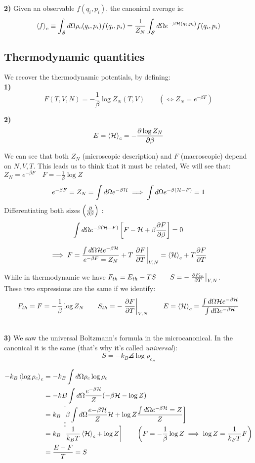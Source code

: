 \textbf{2)} Given an observable $f(q_i,p_i)$, the canonical average is:
$$ \left<f\right>_c \equiv \int_{\mathcal{S}} d\Omega \rho_c(q_i,p_i) f(q_i,p_i) = \frac 1{Z_N} \int_{\mathcal{S}} d\Omega e^{-\beta \mathcal{H}(q_i,p_i)} f(q_i,p_i)$$

\subsection{Thermodynamic quantities}
We recover the thermodynamic potentials, by defining:\\

\textbf{1)} $$F(T,V,N) = -\frac 1\beta \log Z_N(T,V) \qquad (\iff Z_N = e^{-\beta F})$$

\textbf{2)} $$E = \left<\mathcal{H}\right>_c = -\frac{\partial\log Z_N}{\partial\beta}$$

\Pf We can see that both $Z_N$ (microscopic description) and $F$ (macroscopic) depend on $N,V,T$. This leads us to think that it must be related,  We will see that: $Z_N = e^{-\beta F} \quad F = -\frac 1{\beta} \log Z$
$$ e^{-\beta F} = Z_N = \int d\Omega e^{-\beta\mathcal{H}} \implies \int d\Omega e^{-\beta (\mathcal{H}-F)} = 1$$
Differentiating both sizes $\left(\frac{\partial}{\partial\beta}\right)$ : 
$$ \int d\Omega e^{-\beta(\mathcal{H}-F)} \left[F-\mathcal{H} + \beta \frac{\partial F}{\partial\beta}\right] = 0$$


$$ \implies F = \frac{\int d\Omega \mathcal{H} e^{-\beta \mathcal{H}}}{e^{-\beta F} = Z_N} + T \left.\frac{\partial F}{\partial T}\right|_{V,N} = \left<\mathcal{H}\right>_c + T\frac{\partial F}{\partial T}$$

While in thermodynamic we have $F_{th} = E_{th} - TS \qquad S = -\left.\frac{\partial F_{th}}{\partial T}\right|_{V,N}$.\\
These two expressions are the same if we identify: 
$$F_{th} = F = -\frac1\beta \log{Z_N} \qquad S_{th} = -\left.\frac{\partial F}{\partial T}\right|_{V,N} \qquad E = \left<\mathcal{H}\right>_c = \frac{\int d\Omega \mathcal{H} e^{-\beta \mathcal{H}}}{\int d\Omega e^{-\beta\mathcal{H}}}$$

\EndPf

\\

\textbf{3)} We saw the universal Boltzmann's formula in the microcanonical. In the canonical it is the same (that's why it's called \textit{universal}):
$$ \boxed{S = -k_B \angles{\log \rho_c}_c}$$

\Pf 
\begin{align*}
    -k_B\left<\log \rho_c\right>_c &= -k_B\int d\Omega \rho_c \log \rho_c \\
    &= -kB \int d\Omega \frac{e^{-\beta \mathcal{H}}}Z (-\beta\mathcal{H} - \log Z) \\
    &= k_B\left[\beta \int d\Omega \frac{e{-\beta\mathcal{H}}}Z\mathcal{H} + \log Z \frac{\int d\Omega e^{-\beta \mathcal{H}} = Z}Z\right] \\
    &= k_B\left[\frac 1{k_BT}\left<\mathcal{H}\right>_c + \log Z\right] \qquad \left(F = -\frac 1\beta \log Z \implies \log Z = \frac 1{k_BT}F\right) \\
    &= \frac {E-F}T = S
\end{align*}


